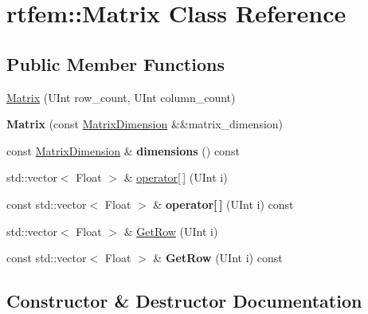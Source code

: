 \hypertarget{classrtfem_1_1Matrix}{}\section{rtfem\+:\+:Matrix Class Reference}
\label{classrtfem_1_1Matrix}
\subsection*{Public Member Functions}
\begin{DoxyCompactItemize}
\item 
\hyperlink{classrtfem_1_1Matrix_af6122e873f49182e48f95a2d3a91f5ba}{Matrix} (U\+Int row\+\_\+count, U\+Int column\+\_\+count)
\item 
\mbox{\label{classrtfem_1_1Matrix_a71423cbb4c6cbe0c46bb4a8cc4e87063}} 
{\bfseries Matrix} (const \hyperlink{structrtfem_1_1MatrixDimension}{Matrix\+Dimension} \&\&matrix\+\_\+dimension)
\item 
\mbox{\label{classrtfem_1_1Matrix_a931e8b928bb80eeab0b3f32ab8cf7634}} 
const \hyperlink{structrtfem_1_1MatrixDimension}{Matrix\+Dimension} \& {\bfseries dimensions} () const
\item 
std\+::vector$<$ Float $>$ \& \hyperlink{classrtfem_1_1Matrix_afc502c2c20deb2a11562f6d55217093b}{operator\mbox{[}$\,$\mbox{]}} (U\+Int i)
\item 
\mbox{\label{classrtfem_1_1Matrix_a799f80a8ff3f0794814e848fb90d2a1e}} 
const std\+::vector$<$ Float $>$ \& {\bfseries operator\mbox{[}$\,$\mbox{]}} (U\+Int i) const
\item 
std\+::vector$<$ Float $>$ \& \hyperlink{classrtfem_1_1Matrix_acbb68e60ae9007c824c058b1e10825a5}{Get\+Row} (U\+Int i)
\item 
\mbox{\label{classrtfem_1_1Matrix_a892b9524461866bd8cdb291ff608aa00}} 
const std\+::vector$<$ Float $>$ \& {\bfseries Get\+Row} (U\+Int i) const
\end{DoxyCompactItemize}


\subsection{Constructor \& Destructor Documentation}
\mbox{\label{classrtfem_1_1Matrix_af6122e873f49182e48f95a2d3a91f5ba}} 

